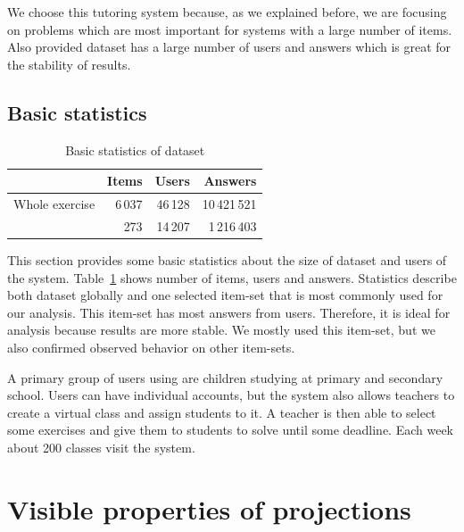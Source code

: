 \documentclass[
  printed, %
  table,   %
  nolof,     %
  nolot,     %
  color,
  final,
  nocover
]{fithesis3}
\begin{document}

We choose this tutoring system because, as we explained before, we are focusing on problems which are most important for systems with a large number of items. Also provided dataset has a large number of users and answers which is great for the stability of results.


\subsection{Basic statistics}\label{basic-statistics}

\begin{table}
  \begin{tabular}{|l|r r r|}
    \hline
    \cellcolor[gray]{1.0} & Items & Users & Answers \\
    \hline
    Whole exercise & 6\,037 & 46\,128 & 10\,421\,521 \\
    \cviceniB{} & 273 & 14\,207 & 1\,216\,403 \\
    \hline
  \end{tabular}
  \caption{Basic statistics of dataset}
  \label{tab:basic-statistics}
\end{table}

This section provides some basic statistics about the size of dataset and users of the system. Table~\ref{tab:basic-statistics} shows number of items, users and answers. Statistics describe both dataset globally and one selected item-set \cviceniB{} that is most commonly used for our analysis. This item-set has most answers from users. Therefore, it is ideal for analysis because results are more stable. We mostly used this item-set, but we also confirmed observed behavior on other item-sets.


A primary group of users using \umimeCesky{} are children studying at primary and secondary school. Users can have individual accounts, but the system also allows teachers to create a virtual class and assign students to it. A teacher is then able to select some exercises and give them to students to solve until some deadline. Each week about 200 classes visit the system.


\section{Visible properties of projections}\label{visible-properties-of-projections}
\end{document}
